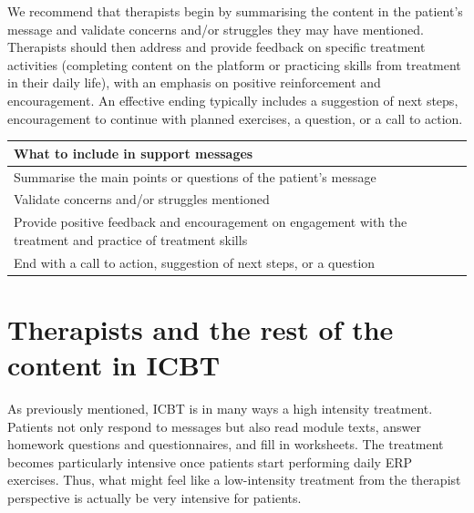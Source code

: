 \documentclass[]{book}
\theoremstyle{definition}
\theoremstyle{definition}
\theoremstyle{definition}
\theoremstyle{remark}
\begin{document}
We recommend that therapists begin by summarising the content in the
patient's message and validate concerns and/or struggles they may have
mentioned. Therapists should then address and provide feedback on
specific treatment activities (completing content on the platform or
practicing skills from treatment in their daily life), with an emphasis
on positive reinforcement and encouragement. An effective ending
typically includes a suggestion of next steps, encouragement to continue
with planned exercises, a question, or a call to action.

\begin{longtable}[]{@{}l@{}}
\toprule
\begin{minipage}[b]{0.97\columnwidth}\raggedright
\textbf{What to include in support messages}\strut
\end{minipage}\tabularnewline
\midrule
\endhead
\begin{minipage}[t]{0.97\columnwidth}\raggedright
Summarise the main points or questions of the patient's message\strut
\end{minipage}\tabularnewline
\begin{minipage}[t]{0.97\columnwidth}\raggedright
Validate concerns and/or struggles mentioned\strut
\end{minipage}\tabularnewline
\begin{minipage}[t]{0.97\columnwidth}\raggedright
Provide positive feedback and encouragement on engagement with the
treatment and practice of treatment skills\strut
\end{minipage}\tabularnewline
\begin{minipage}[t]{0.97\columnwidth}\raggedright
End with a call to action, suggestion of next steps, or a question\strut
\end{minipage}\tabularnewline
\bottomrule
\end{longtable}

\hypertarget{therapists-and-the-rest-of-the-content-in-icbt}{%
\section{Therapists and the rest of the content in
ICBT}\label{therapists-and-the-rest-of-the-content-in-icbt}}

As previously mentioned, ICBT is in many ways a high intensity
treatment. Patients not only respond to messages but also read module
texts, answer homework questions and questionnaires, and fill in
worksheets. The treatment becomes particularly intensive once patients
start performing daily ERP exercises. Thus, what might feel like a
low-intensity treatment from the therapist perspective is actually be
very intensive for patients.
\end{document}
